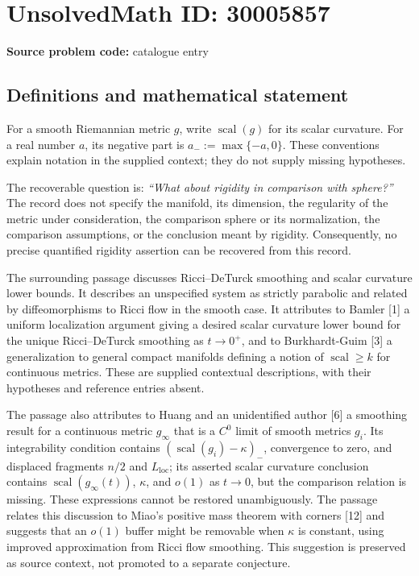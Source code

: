 \documentclass[11pt]{article}
\begin{document}
\section*{UnsolvedMath ID: 30005857}
\textbf{Source problem code:} catalogue entry
\subsection{Definitions and mathematical statement}
For a smooth Riemannian metric \(g\), write \(\operatorname{scal}(g)\) for its scalar curvature. For a real number \(a\), its negative part is \(a_-:=\max\{-a,0\}\). These conventions explain notation in the supplied context; they do not supply missing hypotheses.

The recoverable question is: \emph{``What about rigidity in comparison with sphere?''} The record does not specify the manifold, its dimension, the regularity of the metric under consideration, the comparison sphere or its normalization, the comparison assumptions, or the conclusion meant by rigidity. Consequently, no precise quantified rigidity assertion can be recovered from this record.

The surrounding passage discusses Ricci--DeTurck smoothing and scalar curvature lower bounds. It describes an unspecified system as strictly parabolic and related by diffeomorphisms to Ricci flow in the smooth case. It attributes to Bamler [1] a uniform localization argument giving a desired scalar curvature lower bound for the unique Ricci--DeTurck smoothing as \(t\to0^+\), and to Burkhardt-Guim [3] a generalization to general compact manifolds defining a notion of \(\operatorname{scal}\geq k\) for continuous metrics. These are supplied contextual descriptions, with their hypotheses and reference entries absent.

The passage also attributes to Huang and an unidentified author [6] a smoothing result for a continuous metric \(g_\infty\) that is a \(C^0\) limit of smooth metrics \(g_i\). Its integrability condition contains \((\operatorname{scal}(g_i)-\kappa)_-\), convergence to zero, and displaced fragments \(n/2\) and \(L_{\mathrm{loc}}\); its asserted scalar curvature conclusion contains \(\operatorname{scal}(g_\infty(t))\), \(\kappa\), and \(o(1)\) as \(t\to0\), but the comparison relation is missing. These expressions cannot be restored unambiguously. The passage relates this discussion to Miao's positive mass theorem with corners [12] and suggests that an \(o(1)\) buffer might be removable when \(\kappa\) is constant, using improved approximation from Ricci flow smoothing. This suggestion is preserved as source context, not promoted to a separate conjecture.
\end{document}
